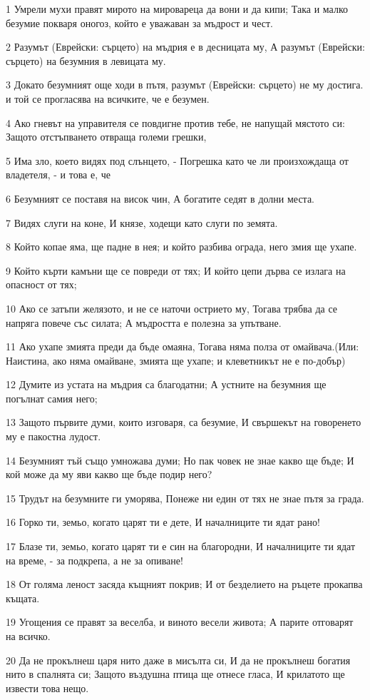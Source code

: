\par 1 Умрели мухи правят мирото на мировареца да вони и да кипи; Така и малко безумие покваря оногоз, който е уважаван за мъдрост и чест.
\par 2 Разумът (Еврейски: сърцето)  на мъдрия е в десницата му, А разумът (Еврейски: сърцето) на безумния в левицата му.
\par 3 Докато безумният още ходи в пътя, разумът (Еврейски: сърцето) не му достига. и той се прогласява на всичките, че е безумен.
\par 4 Ако гневът на управителя се повдигне против тебе, не напущай мястото си: Защото отстъпването отвраща големи грешки,
\par 5 Има зло, което видях под слънцето, - Погрешка като че ли произхождаща от владетеля, - и това е, че
\par 6 Безумният се поставя на висок чин, А богатите седят в долни места.
\par 7 Видях слуги на коне, И князе, ходещи като слуги по земята.
\par 8 Който копае яма, ще падне в нея; и който разбива ограда, него змия ще ухапе.
\par 9 Който кърти камъни ще се повреди от тях; И който цепи дърва се излага на опасност от тях;
\par 10 Ако се затъпи желязото, и не се наточи острието му, Тогава трябва да се напряга повече със силата; А мъдростта е полезна за упътване.
\par 11 Ако ухапе змията преди да бъде омаяна, Тогава няма полза от омайвача.(Или: Наистина, ако няма омайване, змията ще ухапе; и клеветникът не е по-добър)
\par 12 Думите из устата на мъдрия са благодатни; А устните на безумния ще погълнат самия него;
\par 13 Защото  първите думи, които изговаря, са безумие, И свършекът на говоренето му е пакостна лудост.
\par 14 Безумният тъй също умножава думи; Но пак човек не знае какво ще бъде; И кой може да му яви какво ще бъде подир него?
\par 15 Трудът на безумните ги уморява, Понеже ни един от тях не знае пътя за града.
\par 16 Горко ти, земьо, когато царят ти е дете, И началниците ти ядат рано!
\par 17 Блазе ти, земьо, когато царят ти е син на благородни, И началниците ти ядат на време, - за подкрепа, а не за опиване!
\par 18 От голяма леност засяда къщният покрив; И от безделието на ръцете прокапва къщата.
\par 19 Угощения се правят за веселба, и виното весели живота; А парите отговарят на всичко.
\par 20 Да не прокълнеш царя нито даже в мисълта си, И да не прокълнеш богатия нито в спалнята си; Защото въздушна птица ще отнесе гласа, И крилатото ще извести това нещо.

